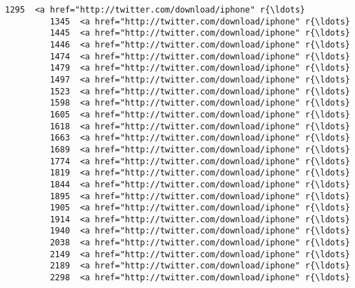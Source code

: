 \documentclass[11pt]{article}
\begin{document}
\begin{Verbatim}[commandchars=\\\{\}]
         1295  <a href="http://twitter.com/download/iphone" r{\ldots}   
         1345  <a href="http://twitter.com/download/iphone" r{\ldots}   
         1445  <a href="http://twitter.com/download/iphone" r{\ldots}   
         1446  <a href="http://twitter.com/download/iphone" r{\ldots}   
         1474  <a href="http://twitter.com/download/iphone" r{\ldots}   
         1479  <a href="http://twitter.com/download/iphone" r{\ldots}   
         1497  <a href="http://twitter.com/download/iphone" r{\ldots}   
         1523  <a href="http://twitter.com/download/iphone" r{\ldots}   
         1598  <a href="http://twitter.com/download/iphone" r{\ldots}   
         1605  <a href="http://twitter.com/download/iphone" r{\ldots}   
         1618  <a href="http://twitter.com/download/iphone" r{\ldots}   
         1663  <a href="http://twitter.com/download/iphone" r{\ldots}   
         1689  <a href="http://twitter.com/download/iphone" r{\ldots}   
         1774  <a href="http://twitter.com/download/iphone" r{\ldots}   
         1819  <a href="http://twitter.com/download/iphone" r{\ldots}   
         1844  <a href="http://twitter.com/download/iphone" r{\ldots}   
         1895  <a href="http://twitter.com/download/iphone" r{\ldots}   
         1905  <a href="http://twitter.com/download/iphone" r{\ldots}   
         1914  <a href="http://twitter.com/download/iphone" r{\ldots}   
         1940  <a href="http://twitter.com/download/iphone" r{\ldots}   
         2038  <a href="http://twitter.com/download/iphone" r{\ldots}   
         2149  <a href="http://twitter.com/download/iphone" r{\ldots}   
         2189  <a href="http://twitter.com/download/iphone" r{\ldots}   
         2298  <a href="http://twitter.com/download/iphone" r{\ldots}   
         

\end{Verbatim}
\end{document}
